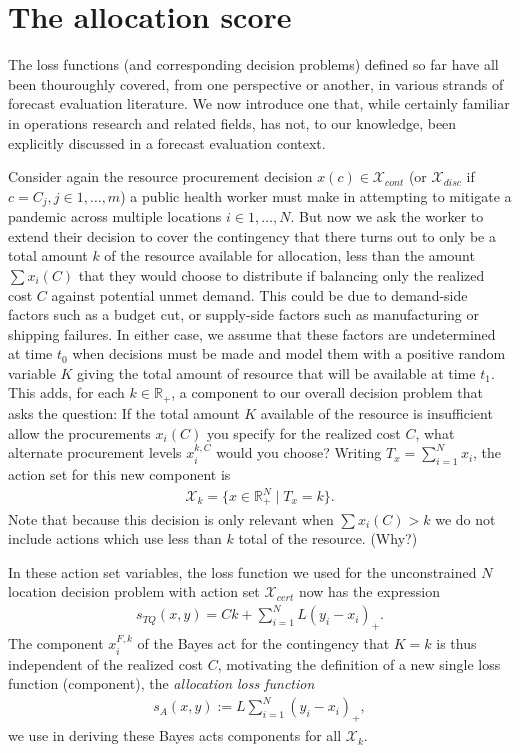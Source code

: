 \documentclass{article}
\begin{document}
\section{The allocation score}

The loss functions (and corresponding decision problems) defined so far have all been thouroughly covered, from one perspective or another, in various strands of forecast evaluation literature.  We now introduce one that, while certainly familiar in operations research and related fields, has not, to our knowledge, been explicitly discussed in a forecast evaluation context. 

Consider again the resource procurement decision $x(c) \in \mathcal{X}_{cont}$ (or $\mathcal{X}_{disc}$ if $c = C_j, j \in 1,\ldots,m$) a public health worker must make in 
attempting to mitigate a pandemic across multiple locations $i \in 1,\ldots,N$.  But now we ask the worker to extend their decision to cover the contingency that there turns out to only be a total amount $k$ of the resource available for allocation, less than the amount $\sum x_i(C)$ that they would choose to distribute if balancing only the realized cost $C$ against potential unmet demand.  This could be due to demand-side factors such as a budget cut, or supply-side factors such as manufacturing or shipping failures. In either case, we assume that these factors are undetermined at time $t_0$ when decisions must be made and model them with a positive random variable $K$ giving the total amount of resource that will be available
at time $t_1$.  This adds, for each $k \in \mathbb{R}_{+}$, a component to our overall decision problem that asks the question: If the total amount $K$ available of the resource is insufficient allow the procurements $x_i(C)$ you specify for the realized cost $C$, what alternate procurement levels $x_i^{k,C}$ would you choose? Writing $T_x = \sum_{i=1}^{N} x_i$, the action set for this new component is 
\begin{align}
\mathcal{X}_k = \{x \in \mathbb{R}_{+}^N \mid T_x = k\}.
\end{align}
Note that because this decision is only relevant when $\sum x_i(C)>k$ we do not include actions which use less than $k$ total of the resource. (Why?)
 
In these action set variables, the loss function we used for the unconstrained $N$ location decision problem with action set $\mathcal{X}_{cert}$ now has the expression
\begin{align}
s_{TQ}\left(x, y\right) = Ck + \sum_{i=1}^{N} L(y_i - x_i)_{+}.
\end{align}
The component $x_i^{F,k}$ of the Bayes act for the contingency that $K=k$ is thus independent of the realized cost $C$, motivating the definition of a new single loss function (component), the \emph{allocation loss function}
\begin{align}
s_{A}(x,y):= L\sum_{i=1}^{N} (y_i - x_i)_{+},
\end{align}
we use in deriving these Bayes acts components for all $\mathcal{X}_k$.
\end{document}
